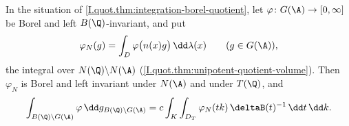In the situation of \cref{I.quot.thm:integration-borel-quotient}, let $\varphi\colon G(\A)\to[0,\infty]$ be Borel and
left $B(\Q)$-invariant, and put
\[
  \varphi_N(g)=\int_D\varphi\bigl(n(x)g\bigr)\,\dd\lambda(x)\qquad(g\in G(\A)),
\]
the integral over $N(\Q)\backslash N(\A)$ (\cref{I.quot.thm:unipotent-quotient-volume}). Then $\varphi_N$ is Borel and
left invariant under $N(\A)$ and under $T(\Q)$, and
\[
  \int_{B(\Q)\backslash G(\A)}\varphi\,\dd g_{B(\Q)\backslash G(\A)}=c\int_K\int_{D_T}\varphi_N(tk)\,\deltaB(t)^{-1}\,\dd t\,\dd k .
\]
